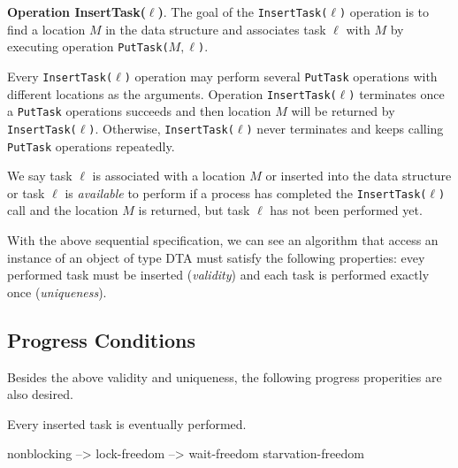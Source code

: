 \textbf{Operation InsertTask($\ell$)}.
The goal of the \texttt{InsertTask(}$\ell$\texttt{)} operation is to find a location $M$ in the data structure and
associates task $\ell$ with $M$ by executing operation \texttt{PutTask(}$M,\ell$\texttt{)}.

Every \texttt{InsertTask(}$\ell$\texttt{)} operation may perform several \texttt{PutTask} operations with
different locations as the arguments. Operation \texttt{InsertTask(}$\ell$\texttt{)} terminates once a
\texttt{PutTask} operations succeeds and then location $M$ will be returned by \texttt{InsertTask(}$\ell$\texttt{)}.
Otherwise, \texttt{InsertTask(}$\ell$\texttt{)} never terminates and keeps
calling \texttt{PutTask} operations repeatedly.

We say task $\ell$ is associated with a location $M$ or inserted into the data structure or task $\ell$
is \emph{available} to perform if a process has completed the \texttt{InsertTask(}$\ell$\texttt{)} call and the location
$M$ is returned, but task $\ell$ has not been performed yet.

With the above sequential specification, we can see an algorithm that access an instance of an object of type DTA
must satisfy the following properties: evey performed task must be inserted (\emph{validity}) and each task is performed
exactly once (\emph{uniqueness}).

\subsection{Progress Conditions}

Besides the above validity and uniqueness, the following progress properities are also desired. 

\begin{condition}
Every inserted task is eventually performed.
\end{condition}

nonblocking --> lock-freedom --> wait-freedom
starvation-freedom

%
%
%


